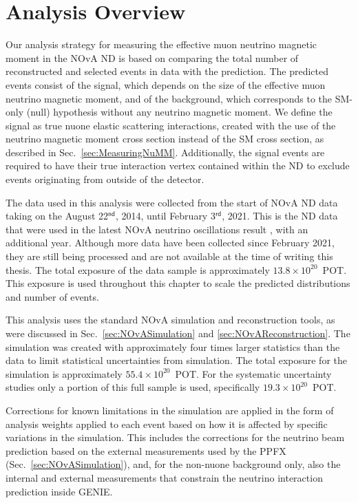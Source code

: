 \section{Analysis Overview}\label{sec:NuMMAnalysisOverview}

Our analysis strategy for measuring the effective muon neutrino magnetic moment in the \gls{NOvA} \gls{ND} is based on comparing the total number of reconstructed and selected events in data with the prediction. The predicted events consist of the signal, which depends on the size of the effective muon neutrino magnetic moment, and of the background, which corresponds to the \gls{SM}-only (null) hypothesis without any neutrino magnetic moment. We define the signal as true \gls{nuone} elastic scattering interactions, created with the use of the neutrino magnetic moment cross section instead of the \gls{SM} cross section, as described in Sec.~\ref{sec:MeasuringNuMM}. Additionally, the signal events are required to have their true interaction vertex contained within the \gls{ND} to exclude events originating from outside of the detector.

The data used in this analysis were collected from the start of \gls{NOvA} \gls{ND} data taking on the August 22$^{\textsf{nd}}$, 2014, until February 3$^{\textsf{rd}}$, 2021. This is the \gls{ND} data that were used in the latest \gls{NOvA} neutrino oscillations result \cite{NOvAResults2021.pdf}, with an additional year. Although more data have been collected since February 2021, they are still being processed and are not available at the time of writing this thesis. The total exposure of the data sample is approximately $13.8\times10^{20}$~\gls{POT}. This exposure is used throughout this chapter to scale the predicted distributions and number of events.

This analysis uses the standard \gls{NOvA} simulation and reconstruction tools, as were discussed in Sec.~\ref{sec:NOvASimulation} and \ref{sec:NOvAReconstruction}. The simulation was created with approximately four times larger statistics than the data to limit statistical uncertainties from simulation. The total exposure for the simulation is approximately $55.4\times10^{20}$~\gls{POT}. For the systematic uncertainty studies only a portion of this full sample is used, specifically $19.3\times10^{20}$~\gls{POT}.

Corrections for known limitations in the simulation are applied in the form of analysis weights applied to each event based on how it is affected by specific variations in the simulation. This includes the corrections for the neutrino beam prediction based on the external measurements used by the \gls{PPFX} (Sec.~\ref{sec:NOvASimulation}), and, for the non-\gls{nuone} background only, also the internal and external measurements that constrain the neutrino interaction prediction inside GENIE.

